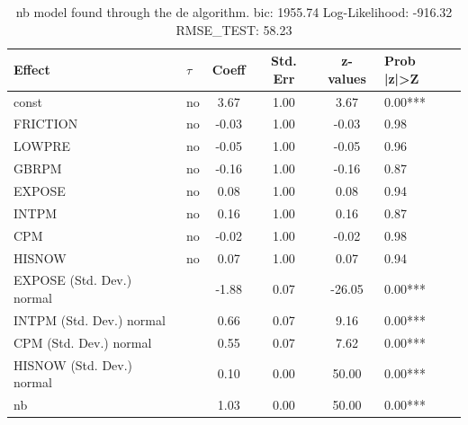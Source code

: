 \begin{table}
	\caption{nb model found through the de algorithm. bic: 1955.74 Log-Likelihood: -916.32 RMSE_TEST: 58.23}
	\begin{center}
		\begin{tabular}{|l|l|c|c|c|l|}
			\hline
			Effect & $\tau$ & Coeff & Std. Err & z-values & Prob |z|>Z \\
			\hline
			const & no & 3.67 & 1.00 & 3.67 & 0.00*** \\
			\hline
			FRICTION & no & -0.03 & 1.00 & -0.03 & 0.98 \\
			\hline
			LOWPRE & no & -0.05 & 1.00 & -0.05 & 0.96 \\
			\hline
			GBRPM & no & -0.16 & 1.00 & -0.16 & 0.87 \\
			\hline
			EXPOSE & no & 0.08 & 1.00 & 0.08 & 0.94 \\
			\hline
			INTPM & no & 0.16 & 1.00 & 0.16 & 0.87 \\
			\hline
			CPM & no & -0.02 & 1.00 & -0.02 & 0.98 \\
			\hline
			HISNOW & no & 0.07 & 1.00 & 0.07 & 0.94 \\
			\hline
			EXPOSE (Std. Dev.) normal &  & -1.88 & 0.07 & -26.05 & 0.00*** \\
			\hline
			INTPM (Std. Dev.) normal &  & 0.66 & 0.07 & 9.16 & 0.00*** \\
			\hline
			CPM (Std. Dev.) normal &  & 0.55 & 0.07 & 7.62 & 0.00*** \\
			\hline
			HISNOW (Std. Dev.) normal &  & 0.10 & 0.00 & 50.00 & 0.00*** \\
			\hline
			nb &  & 1.03 & 0.00 & 50.00 & 0.00*** \\
			\hline
		\end{tabular}
	\end{center}
\end{table}